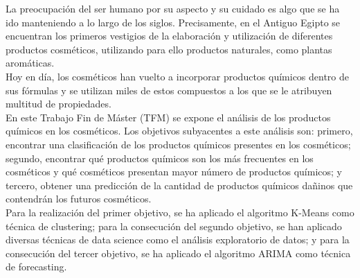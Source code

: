 

La preocupación del ser humano por su aspecto y su cuidado es algo que se ha ido manteniendo a lo largo de los siglos. Precisamente, en el Antiguo Egipto se encuentran los primeros vestigios de la elaboración y utilización de diferentes productos cosméticos, utilizando para ello productos naturales, como plantas aromáticas. \\

Hoy en día, los cosméticos han vuelto a incorporar productos químicos dentro de sus fórmulas y se utilizan miles de estos compuestos a los que se le atribuyen multitud de propiedades. \\

En este Trabajo Fin de Máster (TFM) se expone el análisis de los productos químicos en los cosméticos. Los objetivos subyacentes a este análisis son: primero, encontrar una clasificación de los productos químicos presentes en los cosméticos; segundo, encontrar qué productos químicos son los más frecuentes en los cosméticos y qué cosméticos presentan mayor número de productos químicos; y tercero, obtener una predicción de la cantidad de productos químicos dañinos que contendrán los futuros cosméticos. \\

Para la realización del primer objetivo, se ha aplicado el algoritmo K-Means como técnica de clustering; para la consecución del segundo objetivo, se han aplicado diversas técnicas de data science como el análisis exploratorio de datos; y para la consecución del tercer objetivo, se ha aplicado el algoritmo ARIMA como técnica de forecasting.


